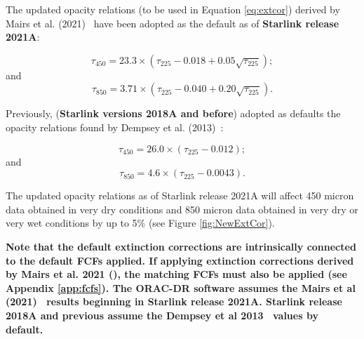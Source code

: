 The updated opacity relations (to be used in Equation \ref{eq:extcor}) 
derived by Mairs et al. (2021)~\cite{mairs21}
have been adopted as the default as of \textbf{Starlink release 2021A}:

\begin{equation}
\tau_{450} = 23.3 \times (\tau_{225} - 0.018 + 0.05\sqrt{\tau_{225}});
\end{equation}
and
\begin{equation}
\tau_{850} = 3.71 \times (\tau_{225} - 0.040 + 0.20\sqrt{\tau_{225}}).
\end{equation}

Previously, (\textbf{Starlink versions 2018A and before}) adopted as defaults the opacity relations 
found by Dempsey et al. (2013)~\cite{dempsey12}:

\begin{equation}
\tau_{450} = 26.0 \times (\tau_{225} - 0.012);
\end{equation}
and
\begin{equation}
\tau_{850} = 4.6 \times (\tau_{225} - 0.0043).
\end{equation}

The updated opacity relations as of Starlink release 2021A  will affect 
450 micron data obtained in very dry conditions and 850 micron data 
obtained in very dry or very wet conditions by up to 5\% (see Figure \ref{fig:NewExtCor}).

\textbf{Note that the default extinction corrections are intrinsically connected to the default FCFs
applied. If applying extinction corrections derived by Mairs et al. 2021 (\cite{mairs21}), the matching
FCFs must also be applied (see Appendix \ref{app:fcfs}). The ORAC-DR software assumes the 
Mairs et al (2021)~\cite{mairs21}
results beginning in Starlink release 2021A. Starlink release 2018A and previous assume the 
Dempsey et al 2013~\cite{dempsey12} values by default.}

